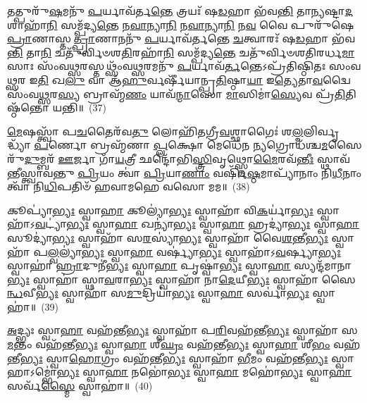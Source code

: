 𑌤𑌤𑍍𑌪𑍁𑌰𑍁᳴\-\ul{𑌷}\-𑌮𑌨𑍁᳴ \ul{𑌪}\-𑌰𑍍𑌯𑌾𑌵᳴𑌰𑍍𑌤\-\ul{𑌨𑍍𑌤𑍇} 𑌤𑍍𑌰𑌯𑌃᳴ 𑌷\-\ul{𑌡}\-𑌹𑌾 𑌭᳴𑌵\-\ul{𑌨𑍍𑌤𑌿} 𑌤𑌾\-\ul{𑌨𑍍𑌯}\-𑌷𑍍𑌟𑌾\-\ul{𑌦}\-𑌶𑌾𑌹𑌾᳴\-\ul{𑌨𑌿} 𑌸𑌮𑍍𑌪᳴𑌦𑍍𑌯\-\ul{𑌨𑍍𑌤𑍇} 𑌨\-\ul{𑌵𑌾}\-𑌨𑍍𑌯𑌾\-\ul{𑌨𑌿} 𑌨\-\ul{𑌵𑌾}\-𑌨𑍍𑌯𑌾\-\ul{𑌨𑌿} 𑌨\-\ul{𑌵} 𑌵𑍈 𑌪𑍁𑌰𑍁᳴𑌷𑍇 \ul{𑌪𑍍𑌰𑌾}\-𑌣𑌾𑌸𑍍𑌤\-\ul{𑌤𑍍𑌪𑍍𑌰𑌾}\-𑌣𑌾𑌨𑌨𑍁᳴ \ul{𑌪}\-𑌰𑍍𑌯𑌾𑌵᳴𑌰𑍍𑌤𑌨𑍍𑌤𑍇 \ul{𑌚}\-𑌤𑍍𑌵𑌾𑌰𑌃᳴ 𑌷\-\ul{𑌡}\-𑌹𑌾 𑌭᳴𑌵\-\ul{𑌨𑍍𑌤𑌿} 𑌤𑌾\-\ul{𑌨𑌿} 𑌚𑌤𑍁᳴𑌰𑍍𑌵𑌿𑍞𑌶\-\ul{𑌤𑌿}\-𑌰𑌹𑌾᳴\-\ul{𑌨𑌿} 𑌸𑌮𑍍𑌪᳴𑌦𑍍𑌯\-\ul{𑌨𑍍𑌤𑍇} 𑌚𑌤𑍁᳴𑌰𑍍𑌵𑌿𑍞𑌶𑌤𑌿𑌰𑌰𑍍𑌧\-\ul{𑌮𑌾}\-𑌸𑌾𑌃 𑌸𑌂᳴𑌵\-\ul{𑌥𑍍𑌸}\-𑌰𑌸𑍍𑌤𑌥𑍍𑌸𑌂᳴𑌵\-\ul{𑌥𑍍𑌸}\-𑌰𑌮𑌨𑍁᳴ \ul{𑌪}\-𑌰𑍍𑌯𑌾𑌵᳴\-\ul{𑌰𑍍𑌤}\-𑌨𑍍𑌤𑍇\-𑌽𑌪𑍍𑌰᳴𑌤𑌿𑌷𑍍𑌠𑌿𑌤𑌃 𑌸𑌂𑌵\-\ul{𑌥𑍍𑌸}\-𑌰 𑌇\-\ul{𑌤𑌿} 𑌖\-\ul{𑌲𑍁} 𑌵𑌾 𑌆᳴\-\ul{𑌹𑍁}\-𑌰𑍍𑌵𑌰𑍍\mbox{}𑌷𑍀᳴𑌯𑌾𑌨𑍍𑌪𑍍𑌰\-\ul{𑌤𑌿}\-𑌷𑍍𑌠𑌾\-\ul{𑌯𑌾} 𑌇\-\ul{𑌤𑍍𑌯𑍇}\-𑌤𑌾\-\ul{𑌵}\-𑌦𑍍𑌵𑍈 𑌸𑌂᳴𑌵\-\ul{𑌥𑍍𑌸}\-𑌰\-\ul{𑌸𑍍𑌯} 𑌬𑍍𑌰𑌾𑌹𑍍𑌮᳴\-\ul{𑌣𑌂} 𑌯𑌾𑌵᳴\-\ul{𑌨𑍍𑌮𑌾}\-𑌸𑍋 \ul{𑌮𑌾}\-𑌸𑌿𑌮𑌾॑\-\ul{𑌸𑍍𑌯𑍇}\-𑌵 𑌪𑍍𑌰᳴\-\ul{𑌤𑌿}\-𑌤𑌿𑌷𑍍𑌠᳴𑌨𑍍𑌤𑍋 𑌯𑌨𑍍𑌤𑌿॥~(37)

{\anuvakamend[{\-\ul{𑌵𑌿}\-𑌰𑌾𑌜᳴\-\ul{𑌮𑍇}\-𑌤𑍇𑌨᳴ 𑌦𑍍𑌵𑌾\-\ul{𑌦}\-𑌶𑌾\-\ul{𑌵𑍇}\-𑌤𑌾\-\ul{𑌵}\-𑌦𑍍𑌵𑌾 \ul{𑌅}\-𑌷𑍍𑌟𑍗 𑌚᳴}]}%

\-\ul{𑌮𑍇}\-𑌷𑌸𑍍𑌤𑍍𑌵𑌾᳴ 𑌪\-\ul{𑌚}\-𑌤𑍈𑌰᳴𑌵\-\ul{𑌤𑍁} 𑌲𑍋𑌹𑌿᳴𑌤𑌗𑍍𑌰𑍀\-\ul{𑌵}\-𑌶𑍍𑌛𑌾𑌗𑍈𑌃॑ 𑌶\-\ul{𑌲𑍍𑌮}\-𑌲𑌿𑌰𑍍𑌵𑍃𑌦𑍍𑌧𑍍𑌯𑌾᳴ \ul{𑌪}\-𑌰𑍍𑌣𑍋 𑌬𑍍𑌰𑌹𑍍𑌮᳴𑌣𑌾 \ul{𑌪𑍍𑌲}\-𑌕𑍍𑌷𑍋 𑌮𑍇𑌧𑍇᳴𑌨 \ul{𑌨𑍍𑌯}\-𑌗𑍍𑌰𑍋𑌧᳴𑌶𑍍𑌚\-\ul{𑌮}\-𑌸𑍈𑌰𑍁᳴\-\ul{𑌦𑍁}\-𑌮𑍍𑌬𑌰᳴ \ul{𑌊}\-𑌰𑍍𑌜𑌾 𑌗𑌾᳴\-\ul{𑌯}\-𑌤𑍍𑌰𑍀 𑌛𑌨𑍍𑌦𑍋᳴𑌭𑌿\-\ul{𑌸𑍍𑌤𑍍𑌰𑌿}\-𑌵𑍃𑌥𑍍𑌸𑍍𑌤𑍋\-\ul{𑌮𑍈}\-𑌰𑌵᳴\-\ul{𑌨𑍍𑌤𑍀𑌃} 𑌸𑍍𑌥𑌾𑌵᳴𑌨𑍍𑌤𑍀𑌸𑍍𑌤𑍍𑌵𑌾𑌵𑌨𑍍𑌤𑍁 \ul{𑌪𑍍𑌰𑌿}\-𑌯𑌂 𑌤𑍍𑌵𑌾॑ \ul{𑌪𑍍𑌰𑌿}\-𑌯𑌾\-\ul{𑌣𑌾𑌂} 𑌵𑌰𑍍\mbox{}𑌷𑌿᳴\-\ul{𑌷𑍍𑌠}\-𑌮𑌾𑌪𑍍𑌯𑌾᳴𑌨𑌾𑌂 𑌨𑌿\-\ul{𑌧𑍀}\-𑌨𑌾𑌂 𑌤𑍍𑌵𑌾᳴ 𑌨𑌿\-\ul{𑌧𑌿}\-𑌪𑌤𑌿𑍞᳴ 𑌹𑌵𑌾𑌮𑌹𑍇 𑌵𑌸𑍋 𑌮𑌮॥~(38)

{\anuvakamend[{\-\ul{𑌮𑍇}\-𑌷𑌃 𑌷𑌟𑍍𑌤𑍍𑌰𑌿𑍞᳴𑌶𑌤𑍍}]}%

𑌕𑍂𑌪𑍍𑌯𑌾॑\-\ul{𑌭𑍍𑌯𑌃} 𑌸𑍍𑌵𑌾\-\ul{𑌹𑌾} 𑌕𑍂𑌲𑍍𑌯𑌾॑\-\ul{𑌭𑍍𑌯𑌃} 𑌸𑍍𑌵𑌾𑌹𑌾᳴ 𑌵𑌿\-\ul{𑌕}\-𑌰𑍍𑌯𑌾॑\-\ul{𑌭𑍍𑌯𑌃} 𑌸𑍍𑌵𑌾𑌹𑌾᳴\-𑌽\-\ul{𑌵}\-𑌟𑍍𑌯𑌾॑\-\ul{𑌭𑍍𑌯𑌃} 𑌸𑍍𑌵𑌾\-\ul{𑌹𑌾} 𑌖𑌨𑍍𑌯𑌾॑\-\ul{𑌭𑍍𑌯𑌃} 𑌸𑍍𑌵𑌾\-\ul{𑌹𑌾} 𑌹𑍍𑌰𑌦𑍍𑌯𑌾॑\-\ul{𑌭𑍍𑌯𑌃} 𑌸𑍍𑌵𑌾\-\ul{𑌹𑌾} 𑌸𑍂𑌦𑍍𑌯𑌾॑\-\ul{𑌭𑍍𑌯𑌃} 𑌸𑍍𑌵𑌾𑌹𑌾᳴ 𑌸\-\ul{𑌰}\-𑌸𑍍𑌯𑌾॑\-\ul{𑌭𑍍𑌯𑌃} 𑌸𑍍𑌵𑌾𑌹𑌾᳴ 𑌵𑍈\-\ul{𑌶}\-𑌨𑍍𑌤𑍀\-\ul{𑌭𑍍𑌯𑌃} 𑌸𑍍𑌵𑌾𑌹𑌾᳴ 𑌪\-\ul{𑌲𑍍𑌵}\-𑌲𑍍𑌯𑌾॑\-\ul{𑌭𑍍𑌯𑌃} 𑌸𑍍𑌵𑌾\-\ul{𑌹𑌾} 𑌵𑌰𑍍𑌷𑍍𑌯𑌾॑\-\ul{𑌭𑍍𑌯𑌃} 𑌸𑍍𑌵𑌾𑌹𑌾᳴\-𑌽\-\ul{𑌵}\-𑌰𑍍𑌷𑍍𑌯𑌾\-\ul{𑌭𑍍𑌯𑌃} 𑌸𑍍𑌵𑌾𑌹𑌾॑ \ul{𑌹𑍍𑌰𑌾}\-𑌦𑍁𑌨𑍀॑\-\ul{𑌭𑍍𑌯𑌃} 𑌸𑍍𑌵𑌾\-\ul{𑌹𑌾} 𑌪𑍃𑌷𑍍𑌵𑌾॑\-\ul{𑌭𑍍𑌯𑌃} 𑌸𑍍𑌵𑌾\-\ul{𑌹𑌾} 𑌸𑍍𑌯𑌨𑍍𑌦᳴𑌮𑌾𑌨𑌾\-\ul{𑌭𑍍𑌯𑌃} 𑌸𑍍𑌵𑌾𑌹𑌾॑ 𑌸𑍍𑌥𑌾\-\ul{𑌵}\-𑌰𑌾\-\ul{𑌭𑍍𑌯𑌃} 𑌸𑍍𑌵𑌾𑌹𑌾᳴ 𑌨𑌾\-\ul{𑌦𑍇}\-𑌯𑍀\-\ul{𑌭𑍍𑌯𑌃} 𑌸𑍍𑌵𑌾𑌹𑌾᳴ 𑌸𑍈\-\ul{𑌨𑍍𑌧}\-𑌵𑍀\-\ul{𑌭𑍍𑌯𑌃} 𑌸𑍍𑌵𑌾𑌹𑌾᳴ 𑌸\-\ul{𑌮𑍁}\-𑌦𑍍𑌰𑌿𑌯𑌾॑\-\ul{𑌭𑍍𑌯𑌃} 𑌸𑍍𑌵𑌾\-\ul{𑌹𑌾} 𑌸𑌰𑍍𑌵𑌾॑\-\ul{𑌭𑍍𑌯𑌃} 𑌸𑍍𑌵𑌾𑌹𑌾॑॥~(39)

{\anuvakamend[{𑌕𑍂𑌪𑍍𑌯𑌾॑𑌭𑍍𑌯𑌶𑍍𑌚𑌤𑍍𑌵𑌾\-\ul{𑌰𑌿}\-\-\ul{𑍞}\-𑌶𑌤𑍍}]}%

\-\ul{𑌅}\-𑌦𑍍𑌭𑍍𑌯𑌃 𑌸𑍍𑌵𑌾\-\ul{𑌹𑌾} 𑌵𑌹᳴𑌨𑍍𑌤𑍀\-\ul{𑌭𑍍𑌯𑌃} 𑌸𑍍𑌵𑌾𑌹𑌾᳴ 𑌪\-\ul{𑌰𑌿}\-𑌵𑌹᳴𑌨𑍍𑌤𑍀\-\ul{𑌭𑍍𑌯𑌃} 𑌸𑍍𑌵𑌾𑌹𑌾᳴ 𑌸\-\ul{𑌮}\-𑌨𑍍𑌤𑌂 𑌵𑌹᳴𑌨𑍍𑌤𑍀\-\ul{𑌭𑍍𑌯𑌃} 𑌸𑍍𑌵𑌾\-\ul{𑌹𑌾} 𑌶𑍀\-\ul{𑌘𑍍𑌰𑌂} 𑌵𑌹᳴𑌨𑍍𑌤𑍀\-\ul{𑌭𑍍𑌯𑌃} 𑌸𑍍𑌵𑌾\-\ul{𑌹𑌾} 𑌶𑍀\-\ul{𑌭𑌂} 𑌵𑌹᳴𑌨𑍍𑌤𑍀\-\ul{𑌭𑍍𑌯𑌃} 𑌸𑍍𑌵𑌾\-\ul{𑌹𑍋}\-𑌗𑍍𑌰𑌂 𑌵𑌹᳴𑌨𑍍𑌤𑍀\-\ul{𑌭𑍍𑌯𑌃} 𑌸𑍍𑌵𑌾𑌹𑌾᳴ \ul{𑌭𑍀}\-𑌮𑌂 𑌵𑌹᳴𑌨𑍍𑌤𑍀\-\ul{𑌭𑍍𑌯𑌃} 𑌸𑍍𑌵𑌾𑌹𑌾\-𑌽𑌮𑍍𑌭𑍋॑\-\ul{𑌭𑍍𑌯𑌃} 𑌸𑍍𑌵𑌾\-\ul{𑌹𑌾} 𑌨𑌭𑍋॑\-\ul{𑌭𑍍𑌯𑌃} 𑌸𑍍𑌵𑌾\-\ul{𑌹𑌾} 𑌮𑌹𑍋॑\-\ul{𑌭𑍍𑌯𑌃} 𑌸𑍍𑌵𑌾\-\ul{𑌹𑌾} 𑌸𑌰𑍍𑌵᳴\-\ul{𑌸𑍍𑌮𑍈} 𑌸𑍍𑌵𑌾𑌹𑌾॑॥~(40)

